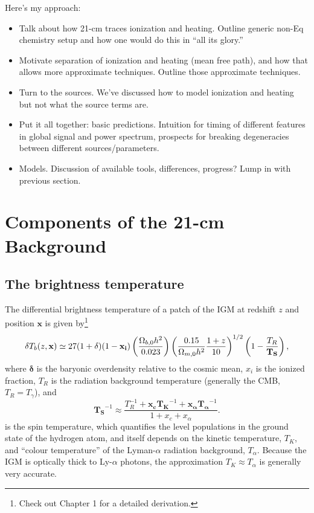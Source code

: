Here's my approach:
\begin{itemize}
	\item Talk about how 21-cm traces ionization and heating. Outline generic non-Eq chemistry setup and how one would do this in ``all its glory.''
	\item Motivate separation of ionization and heating (mean free path), and how that allows more approximate techniques. Outline those approximate techniques.
	\item Turn to the sources. We've discussed how to model ionization and heating but not what the source terms are. 
	\item Put it all together: basic predictions. Intuition for timing of different features in global signal and power spectrum, prospects for breaking degeneracies between different sources/parameters.
	\item Models. Discussion of available tools, differences, progress? Lump in with previous section.
\end{itemize}


\section{Components of the 21-cm Background} \label{sec:RT}

\subsection{The brightness temperature}
The differential brightness temperature of a patch of the IGM at redshift $z$ and position $\mathbf{x}$ is given by\footnote{Check out Chapter 1 for a detailed derivation.} 
\begin{equation}
    \delta T_b(z, \mathbf{x}) \simeq 27 (1 + \boldmath{\delta}) (1 - \mathbf{x_i}) \left(\frac{\Omega_{b,0} h^2}{0.023} \right) \left(\frac{0.15}{\Omega_{m,0} h^2} \frac{1 + z}{10} \right)^{1/2} \left(1 - \frac{T_R}{\mathbf{T_S}} \right) , \label{eq:dTb}
\end{equation}
where $\mathbf{\delta}$ is the baryonic overdensity relative to the cosmic mean, $x_i$ is the ionized fraction, $T_R$ is the radiation background temperature (generally the CMB, $T_R = T_{\gamma}$), and
\begin{equation}
    \mathbf{T_S}^{-1} \approx \frac{T_R^{-1} + \mathbf{x_c} \mathbf{T_K}^{-1} + \mathbf{x_{\alpha}} \mathbf{T_{\alpha}}^{-1}}{1 + x_c + x_{\alpha}} . \label{eq:Ts}
\end{equation}
is the spin temperature, which quantifies the level populations in the ground state of the hydrogen atom, and itself depends on the kinetic temperature, $T_K$, and ``colour temperature'' of the Lyman-$\alpha$ radiation background, $T_{\alpha}$. Because the IGM is optically thick to Ly-$\alpha$ photons, the approximation $T_K \approx T_{\alpha}$ is generally very accurate.

